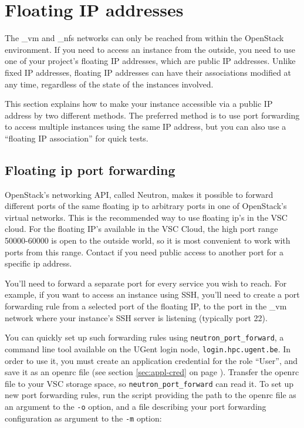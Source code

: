 \section{Floating IP addresses}\label{sec:floating-ip}
The \_vm and \_nfs networks can only be reached from within the
OpenStack environment.  If you need to access an instance from the
outside, you need to use one of your project's floating IP addresses,
which are public IP addresses.  Unlike fixed IP addresses, floating IP
addresses can have their associations modified at any time, regardless
of the state of the instances involved.

This section explains how to make your instance accessible via a
public IP address by two different methods.  The preferred method is
to use port forwarding to access multiple instances using the same IP
address, but you can also use a ``floating IP association'' for quick
tests.

\subsection*{Floating ip port forwarding}
OpenStack's networking API, called Neutron, makes it possible to
forward different ports of the same floating ip to arbitrary ports in
one of OpenStack's virtual networks.  This is the recommended way to
use floating ip's in the VSC cloud.  For the floating IP's available
in the VSC Cloud, the high port range 50000-60000 is open to the
outside world, so it is most convenient to work with ports from this
range.  Contact \cloudinfo if you need public access to another port
for a specific ip address.

You'll need to forward a separate port for every service you wish to
reach.  For example, if you want to access an instance using SSH,
you'll need to create a port forwarding rule from a selected port of
the floating IP, to the port in the \_vm network where your instance's
SSH server is listening (typically port 22).

You can quickly set up such forwarding rules using
\lstinline{neutron_port_forward}, a command line tool available on the
UGent login node, \lstinline{login.hpc.ugent.be}.  In order to use it,
you must create an application credential for the role ``User'', and
save it as an openrc file (see section \ref{sec:appl-cred} on page
\pageref{sec:appl-cred}).  Transfer the openrc file to your VSC
storage space, so \lstinline{neutron_port_forward} can read it.  To
set up new port forwarding rules, run the script providing the path to
the openrc file as an argument to the \lstinline{-o} option, and a
file describing your port forwarding configuration as argument to the
\lstinline{-m} option:

